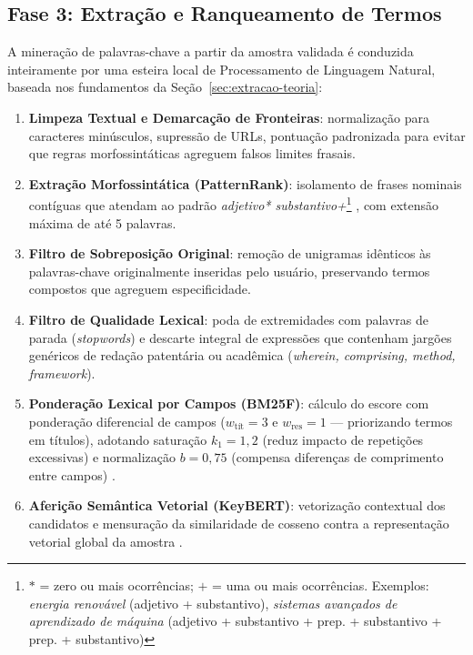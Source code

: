 \documentclass[12pt, a4paper]{article}
\begin{document}
  \subsection{Fase 3: Extração e Ranqueamento de Termos}
  \label{sec:extracao-termos}

  A mineração de palavras-chave a partir da amostra validada é conduzida inteiramente por uma esteira local de Processamento de Linguagem Natural, baseada nos fundamentos da Seção~\ref{sec:extracao-teoria}:

  \begin{enumerate}[label=\textbf{Passo \arabic*.}, leftmargin=2.2cm]
    \item \textbf{Limpeza Textual e Demarcação de Fronteiras}: normalização para caracteres minúsculos, supressão de URLs, pontuação padronizada para evitar que regras morfossintáticas agreguem falsos limites frasais.
    \item \textbf{Extração Morfossintática (PatternRank)}: isolamento de frases nominais contíguas que atendam ao padrão \textit{adjetivo* substantivo+}\footnote{$*$ = zero ou mais ocorrências; $+$ = uma ou mais ocorrências. Exemplos: \textit{energia renovável} (adjetivo + substantivo), \textit{sistemas avançados de aprendizado de máquina} (adjetivo + substantivo + prep. + substantivo + prep. + substantivo)} \cite{schopf2022}, com extensão máxima de até 5 palavras.
    \item \textbf{Filtro de Sobreposição Original}: remoção de unigramas idênticos às palavras-chave originalmente inseridas pelo usuário, preservando termos compostos que agreguem especificidade.
    \item \textbf{Filtro de Qualidade Lexical}: poda de extremidades com palavras de parada (\textit{stopwords}) e descarte integral de expressões que contenham jargões genéricos de redação patentária ou acadêmica (\textit{wherein, comprising, method, framework}).
    \item \textbf{Ponderação Lexical por Campos (BM25F)}: cálculo do escore com ponderação diferencial de campos ($w_{\text{tít}} = 3$ e $w_{\text{res}} = 1$ — priorizando termos em títulos), adotando saturação $k_1 = 1{,}2$ (reduz impacto de repetições excessivas) e normalização $b = 0{,}75$ (compensa diferenças de comprimento entre campos) \cite{robertson2004}.
    \item \textbf{Aferição Semântica Vetorial (KeyBERT)}: vetorização contextual dos candidatos e mensuração da similaridade de cosseno contra a representação vetorial global da amostra \cite{grootendorst2020}.

\end{enumerate}
\end{document}
